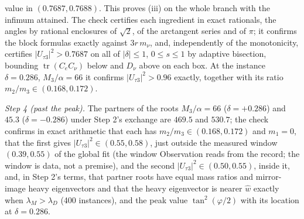value in $(0.7687, 0.7688)$. This proves (iii) on the whole branch with the infimum attained. The check certifies each ingredient in exact rationals, the angles by rational enclosures of $\sqrt{2}$, of the arctangent series and of $\pi$; it confirms the block formulas exactly against $3r\,m_{\nu}$, and, independently of the monotonicity, certifies $|U_{\tau 3}|^{2} > 0.7687$ on all of $|\delta| \le 1$, $0 \le s \le 1$ by adaptive bisection, bounding $\operatorname{tr}(C_{e}C_{\nu})$ below and $D_{\nu}$ above on each box. At the instance $\delta = 0.286$, $M_{3}/\alpha = 66$ it confirms $|U_{\tau 3}|^{2} > 0.96$ exactly, together with its ratio $m_{2}/m_{3} \in (0.168, 0.172)$.

\emph{Step 4 (past the peak).} The partners of the roots $M_{3}/\alpha = 66$ ($\delta = +0.286$) and $45.3$ ($\delta = -0.286$) under Step 2's exchange are $469.5$ and $530.7$; the check confirms in exact arithmetic that each has $m_{2}/m_{3} \in (0.168, 0.172)$ and $m_{1} = 0$, that the first gives $|U_{\tau 3}|^{2} \in (0.55, 0.58)$, just outside the measured window $(0.39, 0.55)$ of the global fit \cite{NuFIT2024} (the window Observation  reads from the record; the window is data, not a premise), and the second $|U_{\tau 3}|^{2} \in (0.50, 0.55)$, inside it, and, in Step 2's terms, that partner roots have equal mass ratios and mirror-image heavy eigenvectors and that the heavy eigenvector is nearer $\hat{w}$ exactly when $\lambda_{M} > \lambda_{D}$ (400 instances), and the peak value $\tan^{2}(\varphi/2)$ with its location at $\delta = 0.286$.
